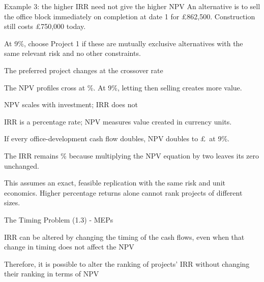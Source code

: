 \documentclass[9pt,aspectratio=169]{beamer}
\newenvironment{wideitemize}{\itemize\addtolength{\itemsep}{10pt}}{\enditemize}
\begin{document}
\begin{frame}{Example 3: the higher IRR need not give the higher NPV}
An alternative is to sell the office block immediately on completion at date 1 for £862,500. Construction still costs £750,000 today.
\begin{center}\end{center}
At 9\%, choose Project 1 if these are mutually exclusive alternatives with the same relevant risk and no other constraints.
\end{frame}

\begin{frame}{The preferred project changes at the crossover rate}
\begin{center}\end{center}
The NPV profiles cross at \CrossRate\%. At 9\%, letting then selling creates more value.
\end{frame}

\begin{frame}{NPV scales with investment; IRR does not}
\begin{wideitemize}
\item IRR is a percentage rate; NPV measures value created in currency units.
\item If every office-development cash flow doubles, NPV doubles to £\DoubleNPV\ at 9\%.
\item The IRR remains \OfficeIRR\% because multiplying the NPV equation by two leaves its zero unchanged.
\item This assumes an exact, feasible replication with the same risk and unit economics. Higher percentage returns alone cannot rank projects of different sizes.
\end{wideitemize}
\end{frame}

\begin{frame}{The Timing Problem (1.3) - MEPs}
\begin{wideitemize}
\item IRR can be altered by changing the timing of the cash flows, even when that change in timing does not affect the NPV
\item Therefore, it is possible to alter the ranking of projects' IRR without changing their ranking in terms of NPV
\end{wideitemize}
\end{frame}
\end{document}
